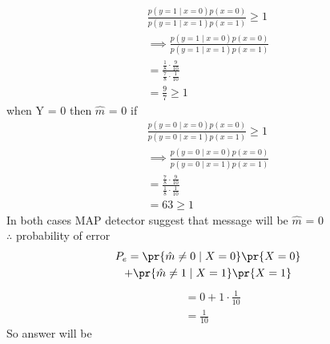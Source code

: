 \documentclass[journal,12pt,twocolumn]{IEEEtran}
\begin{document}
\begin{align}
    \frac{p(y = 1 \mid x = 0) p(x=0)}{p(y =1  \mid x = 1) p(x=1)} \geq 1 \\
\implies  \frac{p(y = 1 \mid x = 0) p(x=0)}{p(y =1  \mid x = 1) p(x=1)} \\
= \frac{\frac{1}{8} \cdot \frac{9}{10}}{\frac{7}{8} \cdot \frac{1}{10}}  \\
= \frac{9}{7} \geq 1
\end{align}
when Y = 0 then $\hat{m}$ = 0 if
\begin{align}
        \frac{p(y = 0 \mid x = 0) p(x=0)}{p(y = 0  \mid x = 1) p(x=1)} \geq 1 \\
\implies  \frac{p(y = 0 \mid x = 0) p(x=0)}{p(y = 0 \mid x = 1) p(x=1)} \\
= \frac{\frac{7}{8} \cdot \frac{9}{10}}{\frac{1}{8} \cdot \frac{1}{10}}  \\
= 63 \geq 1        
\end{align}
In both cases MAP detector suggest that message will be $\hat{m}$ = 0 \\
$\therefore$ probability of error 
\begin{multline}
    P_e  = \pr{\hat{m} \neq 0 \mid X = 0 } \pr{X = 0} \\ + \pr{\hat{m} \neq 1 \mid X = 1} \pr{X = 1} 
\end{multline}
\begin{align}    
    & = 0 + 1 \cdot \frac{1}{10} \\
    & = \frac{1}{10} 
\end{align}
So answer will be 
\end{document}
